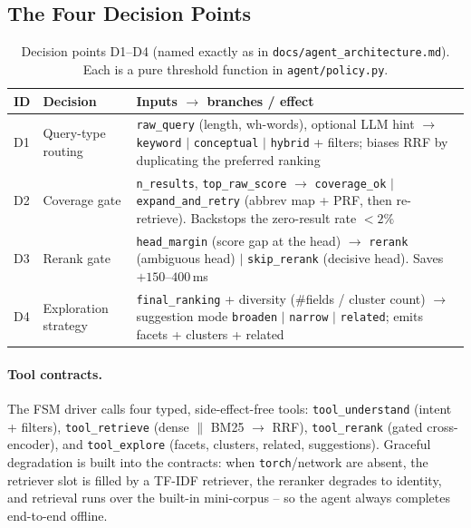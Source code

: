\documentclass[12pt,a4paper]{article}
\begin{document}
\subsection{The Four Decision Points}

\begin{table}[H]
\centering
\caption{Decision points D1--D4 (named exactly as in \texttt{docs/agent\_architecture.md}). Each is a pure threshold function in \texttt{agent/policy.py}.}
\small
\begin{tabularx}{\linewidth}{@{} l l L @{}}
\toprule
\textbf{ID} & \textbf{Decision} & \textbf{Inputs $\rightarrow$ branches / effect} \\
\midrule
D1 & Query-type routing & \texttt{raw\_query} (length, wh-words), optional LLM hint $\rightarrow$ \texttt{keyword} $|$ \texttt{conceptual} $|$ \texttt{hybrid} + filters; biases RRF by duplicating the preferred ranking \\
D2 & Coverage gate & \texttt{n\_results}, \texttt{top\_raw\_score} $\rightarrow$ \texttt{coverage\_ok} $|$ \texttt{expand\_and\_retry} (abbrev map + PRF, then re-retrieve). Backstops the zero-result rate $<2\%$ \\
D3 & Rerank gate & \texttt{head\_margin} (score gap at the head) $\rightarrow$ \texttt{rerank} (ambiguous head) $|$ \texttt{skip\_rerank} (decisive head). Saves $+150$--$400$\,ms \\
D4 & Exploration strategy & \texttt{final\_ranking} + diversity (\#fields / cluster count) $\rightarrow$ suggestion mode \texttt{broaden} $|$ \texttt{narrow} $|$ \texttt{related}; emits facets + clusters + related \\
\bottomrule
\end{tabularx}
\end{table}

\paragraph{Tool contracts.} The FSM driver calls four typed, side-effect-free tools: \texttt{tool\_understand} (intent + filters), \texttt{tool\_retrieve} (dense $\parallel$ BM25 $\rightarrow$ RRF), \texttt{tool\_rerank} (gated cross-encoder), and \texttt{tool\_explore} (facets, clusters, related, suggestions). Graceful degradation is built into the contracts: when \texttt{torch}/network are absent, the retriever slot is filled by a TF-IDF retriever, the reranker degrades to identity, and retrieval runs over the built-in mini-corpus -- so the agent always completes end-to-end offline.
\end{document}
